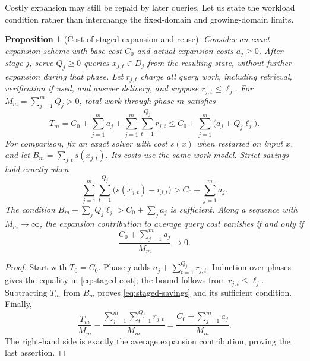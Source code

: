 \documentclass[11pt,a4paper]{article}
\numberwithin{equation}{section}
\theoremstyle{plain}
\newtheorem{proposition}[lemma]{Proposition}
\theoremstyle{definition}
\theoremstyle{remark}
\begin{document}
Costly expansion may still be repaid by later queries. Let us state the workload condition rather than interchange the fixed-domain and growing-domain limits.

\begin{proposition}[Cost of staged expansion and reuse]
\label{prop:staged-reuse}
Consider an exact expansion scheme with base cost $C_0$ and actual expansion costs $a_j\geq0$. After stage $j$, serve $Q_j\geq0$ queries $x_{j,t}\in D_j$ from the resulting state, without further expansion during that phase. Let $r_{j,t}$ charge all query work, including retrieval, verification if used, and answer delivery, and suppose $r_{j,t}\leq\ell_j$. For $M_m=\sum_{j=1}^m Q_j>0$, total work through phase $m$ satisfies
\begin{equation}
T_m=C_0+\sum_{j=1}^m a_j+
\sum_{j=1}^m\sum_{t=1}^{Q_j}r_{j,t}
\leq C_0+\sum_{j=1}^m\bigl(a_j+Q_j\ell_j\bigr).
\label{eq:staged-cost}
\end{equation}
For comparison, fix an exact solver with cost $s(x)$ when restarted on input $x$, and let $B_m=\sum_{j,t}s(x_{j,t})$. Its costs use the same work model. Strict savings hold exactly when
\begin{equation}
\sum_{j=1}^m\sum_{t=1}^{Q_j}\bigl(s(x_{j,t})-r_{j,t}\bigr)
>C_0+\sum_{j=1}^m a_j.
\label{eq:staged-savings}
\end{equation}
The condition $B_m-\sum_j Q_j\ell_j>C_0+\sum_j a_j$ is sufficient. Along a sequence with $M_m\to\infty$, the expansion contribution to average query cost vanishes if and only if
\begin{equation}
\frac{C_0+\sum_{j=1}^m a_j}{M_m}\longrightarrow0.
\label{eq:staged-amortization}
\end{equation}
\end{proposition}

\begin{proof}
Start with $T_0=C_0$. Phase $j$ adds $a_j+\sum_{t=1}^{Q_j}r_{j,t}$. Induction over phases gives the equality in \eqref{eq:staged-cost}; the bound follows from $r_{j,t}\leq\ell_j$. Subtracting $T_m$ from $B_m$ proves \eqref{eq:staged-savings} and its sufficient condition. Finally,
\begin{equation}
\frac{T_m}{M_m}-
\frac{\sum_{j=1}^m\sum_{t=1}^{Q_j}r_{j,t}}{M_m}
=\frac{C_0+\sum_{j=1}^m a_j}{M_m}.
\end{equation}
The right-hand side is exactly the average expansion contribution, proving the last assertion.
\end{proof}
\end{document}
